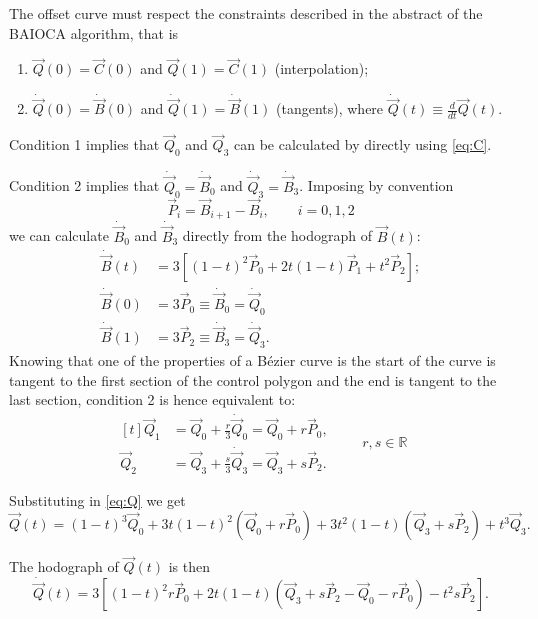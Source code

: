 \documentclass{scrartcl}
\newcommand\V[1]{\vec{#1}}
\newcommand\D[1]{\dot{#1}}
\newcommand\DV[1]{\D{\V{#1}}}
\begin{document}
The offset curve must respect the constraints described in the abstract
of the BAIOCA algorithm, that is
\begin{enumerate}
\item $\V{Q}(0) = \V{C}(0)$ and $\V{Q}(1) = \V{C}(1)$ (interpolation);
\item $\DV{Q}(0) = \DV{B}(0)$ and $\DV{Q}(1) = \DV{B}(1)$ (tangents),
where $\DV{Q}(t) \equiv \frac{d}{dt} \V{Q}(t)$.
\end{enumerate}

\medskip
Condition 1 implies that $\V{Q}_0$ and $\V{Q}_3$ can be calculated by
directly using \eqref{eq:C}.

Condition 2 implies that $\DV{Q}_0 = \DV{B}_0$ and
$\DV{Q}_3 = \DV{B}_3$. Imposing by convention
\begin{equation}\label{eq:pi}
    \V{P}_i = \V{B}_{i+1} - \V{B}_i, \qquad i = 0, 1, 2
\end{equation}
we can calculate $\DV{B}_0$ and $\DV{B}_3$ directly from the hodograph
of $\V{B}(t)$:
\begin{align*}
    \DV{B}(t) &= 3 \left[ (1-t)^2 \V{P}_0 + 2t(1-t) \V{P}_1 + t^2 \V{P}_2 \right]; \\
    \DV{B}(0) &= 3 \V{P}_0 \equiv \DV{B}_0 = \DV{Q}_0 \\
    \DV{B}(1) &= 3 \V{P}_2 \equiv \DV{B}_3 = \DV{Q}_3.
\end{align*}
Knowing that one of the properties of a Bézier curve is the start of the
curve is tangent to the first section of the control polygon and the end
is tangent to the last section, condition 2 is hence equivalent to:
\begin{equation*}
\begin{aligned}[t]
    \V{Q}_1 &= \V{Q}_0 + \frac{r}{3} \DV{Q}_0 = \V{Q}_0 + r \V{P}_0, \\
    \V{Q}_2 &= \V{Q}_3 + \frac{s}{3} \DV{Q}_3 = \V{Q}_3 + s \V{P}_2.
\end{aligned}
\qquad r, s \in \mathbb{R}
\end{equation*}

Substituting in \eqref{eq:Q} we get
\begin{equation}\label{eq:QQ}
    \V{Q}(t) =
	(1-t)^3 \V{Q}_0 +
	3t (1-t)^2 ( \V{Q}_0 + r \V{P}_0 ) +
	3t^2 (1-t) ( \V{Q}_3 + s \V{P}_2 ) +
	t^3\V{Q}_3.
\end{equation}

The hodograph of $\V{Q}(t)$ is then
\begin{equation}\label{eq:QD}
    \DV{Q}(t) = 3 \left[
	(1-t)^2 r \V{P}_0 +
	2t(1-t) (\V{Q}_3 + s \V{P}_2 - \V{Q}_0 - r \V{P}_0) -
	t^2 s \V{P}_2
    \right].
\end{equation}
\end{document}
